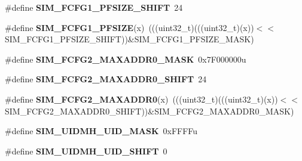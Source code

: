 \begin{DoxyCompactItemize}
\item 
\mbox{\label{group___s_i_m___register___masks_gaec8960bc114f5539e22701491dcf58f7}} 
\#define {\bfseries S\+I\+M\+\_\+\+F\+C\+F\+G1\+\_\+\+P\+F\+S\+I\+Z\+E\+\_\+\+S\+H\+I\+FT}~24
\item 
\mbox{\label{group___s_i_m___register___masks_ga7527f7f4bdcd4c0b2baf6c99a5b6735a}} 
\#define {\bfseries S\+I\+M\+\_\+\+F\+C\+F\+G1\+\_\+\+P\+F\+S\+I\+ZE}(x)~(((uint32\+\_\+t)(((uint32\+\_\+t)(x))$<$$<$S\+I\+M\+\_\+\+F\+C\+F\+G1\+\_\+\+P\+F\+S\+I\+Z\+E\+\_\+\+S\+H\+I\+FT))\&S\+I\+M\+\_\+\+F\+C\+F\+G1\+\_\+\+P\+F\+S\+I\+Z\+E\+\_\+\+M\+A\+SK)
\item 
\mbox{\label{group___s_i_m___register___masks_gad1096c0a75d0bf4dfc93f4b1957fe493}} 
\#define {\bfseries S\+I\+M\+\_\+\+F\+C\+F\+G2\+\_\+\+M\+A\+X\+A\+D\+D\+R0\+\_\+\+M\+A\+SK}~0x7\+F000000u
\item 
\mbox{\label{group___s_i_m___register___masks_ga3ccb8fde0ef2e170d0c84cdfa3651d34}} 
\#define {\bfseries S\+I\+M\+\_\+\+F\+C\+F\+G2\+\_\+\+M\+A\+X\+A\+D\+D\+R0\+\_\+\+S\+H\+I\+FT}~24
\item 
\mbox{\label{group___s_i_m___register___masks_gae7829e3338a5d460d360b8ed9e06e1e1}} 
\#define {\bfseries S\+I\+M\+\_\+\+F\+C\+F\+G2\+\_\+\+M\+A\+X\+A\+D\+D\+R0}(x)~(((uint32\+\_\+t)(((uint32\+\_\+t)(x))$<$$<$S\+I\+M\+\_\+\+F\+C\+F\+G2\+\_\+\+M\+A\+X\+A\+D\+D\+R0\+\_\+\+S\+H\+I\+FT))\&S\+I\+M\+\_\+\+F\+C\+F\+G2\+\_\+\+M\+A\+X\+A\+D\+D\+R0\+\_\+\+M\+A\+SK)
\item 
\mbox{\label{group___s_i_m___register___masks_ga38dffcb27b09a015e2f2e7812d42477c}} 
\#define {\bfseries S\+I\+M\+\_\+\+U\+I\+D\+M\+H\+\_\+\+U\+I\+D\+\_\+\+M\+A\+SK}~0x\+F\+F\+F\+Fu
\item 
\mbox{\label{group___s_i_m___register___masks_ga56b83da182908eb5c406181b72870e54}} 
\#define {\bfseries S\+I\+M\+\_\+\+U\+I\+D\+M\+H\+\_\+\+U\+I\+D\+\_\+\+S\+H\+I\+FT}~0
\item 
\mbox{\label{group___s_i_m___register___masks_ga62269c010d4ee5e3036fea63bbe21702}} 

\end{DoxyCompactItemize}
